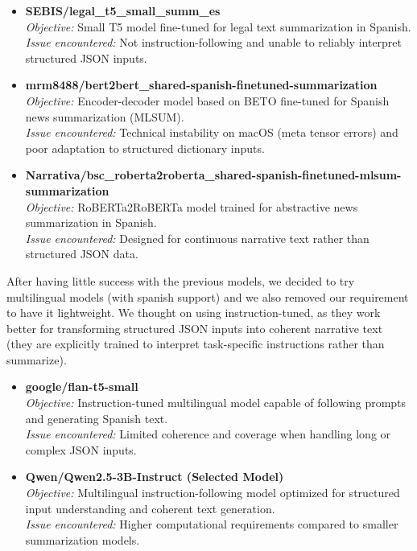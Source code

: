 \documentclass{article}
\begin{document}
\begin{itemize}

\item \textbf{SEBIS/legal\_t5\_small\_summ\_es} \\
\textit{Objective:} Small T5 model fine-tuned for legal text summarization in Spanish. \\
\textit{Issue encountered:} Not instruction-following and unable to reliably interpret structured JSON inputs.

\item \textbf{mrm8488/bert2bert\_shared-spanish-finetuned-summarization} \\
\textit{Objective:} Encoder-decoder model based on BETO fine-tuned for Spanish news summarization (MLSUM). \\
\textit{Issue encountered:} Technical instability on macOS (meta tensor errors) and poor adaptation to structured dictionary inputs.

\item \textbf{Narrativa/bsc\_roberta2roberta\_shared-spanish-finetuned-mlsum-summarization} \\
\textit{Objective:} RoBERTa2RoBERTa model trained for abstractive news summarization in Spanish. \\
\textit{Issue encountered:} Designed for continuous narrative text rather than structured JSON data.

\end{itemize}

After having little success with the previous models, we decided to try multilingual models (with spanish support) and we also removed our requirement to have it lightweight.
We thought on using instruction-tuned, as they work better for transforming structured JSON inputs into coherent narrative text (they are explicitly trained to interpret task-specific instructions rather than summarize).

\begin{itemize}

\item \textbf{google/flan-t5-small} \\
\textit{Objective:} Instruction-tuned multilingual model capable of following prompts and generating Spanish text. \\
\textit{Issue encountered:} Limited coherence and coverage when handling long or complex JSON inputs.

\item \textbf{Qwen/Qwen2.5-3B-Instruct (Selected Model)} \\
\textit{Objective:} Multilingual instruction-following model optimized for structured input understanding and coherent text generation. \\
\textit{Issue encountered:} Higher computational requirements compared to smaller summarization models.

\end{itemize}
\end{document}
